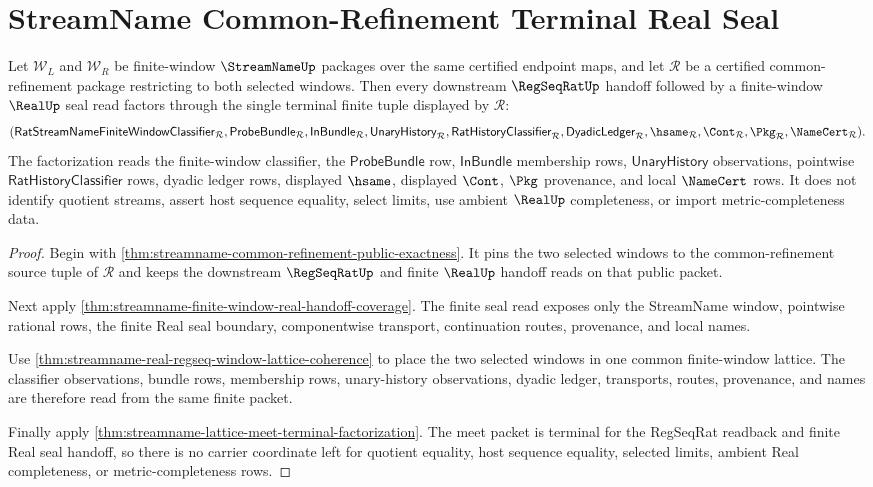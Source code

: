 \section{StreamName Common-Refinement Terminal Real Seal}
\label{sec:streamname-common-refinement-terminal-real-seal}

\begin{theorem}
\label{thm:streamname-common-refinement-terminal-real-seal}
Let $\mathcal W_L$ and $\mathcal W_R$ be finite-window $\StreamNameUp$ packages over the same certified endpoint maps, and let $\mathcal R$ be a certified common-refinement package restricting to both selected windows. Then every downstream $\RegSeqRatUp$ handoff followed by a finite-window $\RealUp$ seal read factors through the single terminal finite tuple displayed by $\mathcal R$:
$$
(\mathsf{RatStreamNameFiniteWindowClassifier}_{\mathcal R},
\mathsf{ProbeBundle}_{\mathcal R},
\mathsf{InBundle}_{\mathcal R},
\mathsf{UnaryHistory}_{\mathcal R},
\mathsf{RatHistoryClassifier}_{\mathcal R},
\mathsf{DyadicLedger}_{\mathcal R},
\hsame_{\mathcal R},
\Cont_{\mathcal R},
\Pkg_{\mathcal R},
\NameCert_{\mathcal R}).
$$
The factorization reads the finite-window classifier, the $\mathsf{ProbeBundle}$ row, $\mathsf{InBundle}$ membership rows, $\mathsf{UnaryHistory}$ observations, pointwise $\mathsf{RatHistoryClassifier}$ rows, dyadic ledger rows, displayed $\hsame$, displayed $\Cont$, $\Pkg$ provenance, and local $\NameCert$ rows. It does not identify quotient streams, assert host sequence equality, select limits, use ambient $\RealUp$ completeness, or import metric-completeness data.
\end{theorem}
\begin{proof}
Begin with \autoref{thm:streamname-common-refinement-public-exactness}. It pins the two selected windows to the common-refinement source tuple of $\mathcal R$ and keeps the downstream $\RegSeqRatUp$ and finite $\RealUp$ handoff reads on that public packet.

Next apply \autoref{thm:streamname-finite-window-real-handoff-coverage}. The finite seal read exposes only the StreamName window, pointwise rational rows, the finite Real seal boundary, componentwise transport, continuation routes, provenance, and local names.

Use \autoref{thm:streamname-real-regseq-window-lattice-coherence} to place the two selected windows in one common finite-window lattice. The classifier observations, bundle rows, membership rows, unary-history observations, dyadic ledger, transports, routes, provenance, and names are therefore read from the same finite packet.

Finally apply \autoref{thm:streamname-lattice-meet-terminal-factorization}. The meet packet is terminal for the RegSeqRat readback and finite Real seal handoff, so there is no carrier coordinate left for quotient equality, host sequence equality, selected limits, ambient Real completeness, or metric-completeness rows.
\end{proof}

